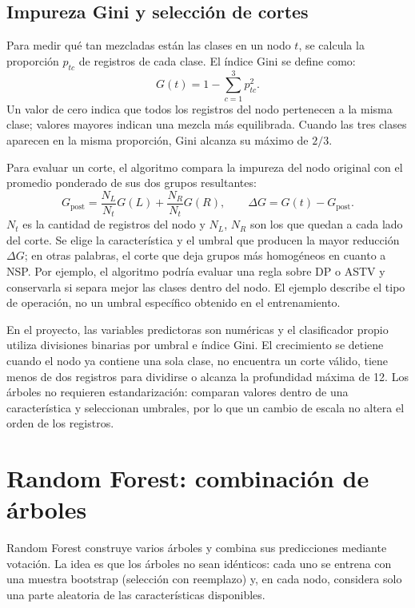 \subsection{Impureza Gini y selecci\'on de cortes}
Para medir qu\'e tan mezcladas est\'an las clases en un nodo $t$, se calcula la proporci\'on $p_{tc}$ de registros de cada clase. El \'indice Gini se define como:
\begin{equation}
G(t)=1-\sum_{c=1}^{3}p_{tc}^{2}.
\end{equation}
Un valor de cero indica que todos los registros del nodo pertenecen a la misma clase; valores mayores indican una mezcla m\'as equilibrada. Cuando las tres clases aparecen en la misma proporci\'on, Gini alcanza su m\'aximo de $2/3$.

Para evaluar un corte, el algoritmo compara la impureza del nodo original con el promedio ponderado de sus dos grupos resultantes:
\begin{equation}
G_{\mathrm{post}}=\frac{N_L}{N_t}G(L)+\frac{N_R}{N_t}G(R),
\qquad
\Delta G=G(t)-G_{\mathrm{post}}.
\end{equation}
$N_t$ es la cantidad de registros del nodo y $N_L$, $N_R$ son los que quedan a cada lado del corte. Se elige la caracter\'istica y el umbral que producen la mayor reducci\'on $\Delta G$; en otras palabras, el corte que deja grupos m\'as homog\'eneos en cuanto a NSP. Por ejemplo, el algoritmo podr\'ia evaluar una regla sobre DP o ASTV y conservarla si separa mejor las clases dentro del nodo. El ejemplo describe el tipo de operaci\'on, no un umbral espec\'ifico obtenido en el entrenamiento.

En el proyecto, las variables predictoras son num\'ericas y el clasificador propio utiliza divisiones binarias por umbral e \'indice Gini. El crecimiento se detiene cuando el nodo ya contiene una sola clase, no encuentra un corte v\'alido, tiene menos de dos registros para dividirse o alcanza la profundidad m\'axima de 12. Los \'arboles no requieren estandarizaci\'on: comparan valores dentro de una caracter\'istica y seleccionan umbrales, por lo que un cambio de escala no altera el orden de los registros.

\section{Random Forest: combinaci\'on de \'arboles}
Random Forest construye varios \'arboles y combina sus predicciones mediante votaci\'on. La idea es que los \'arboles no sean id\'enticos: cada uno se entrena con una muestra bootstrap (selecci\'on con reemplazo) y, en cada nodo, considera solo una parte aleatoria de las caracter\'isticas disponibles.

